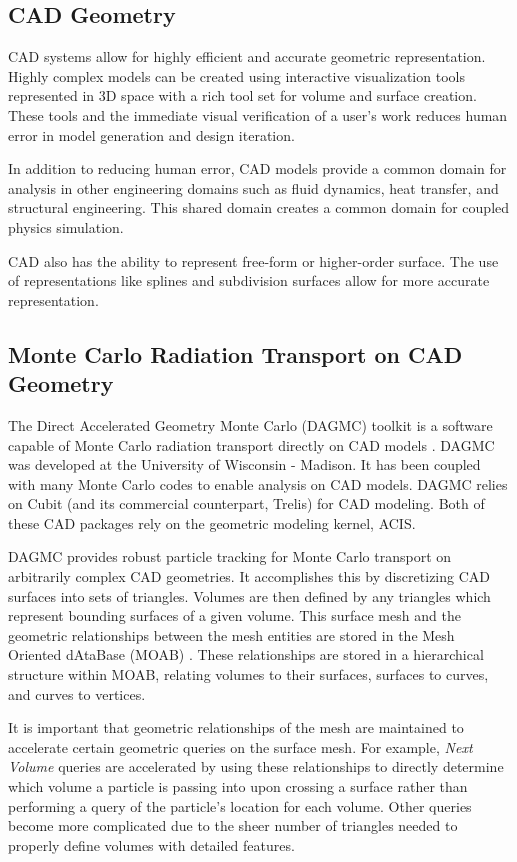\subsection{CAD Geometry}

CAD systems allow for highly efficient and accurate geometric
representation. Highly complex models can be created using interactive
visualization tools represented in 3D space with a rich tool set for volume and
surface creation. These tools and the immediate visual verification of a user's
work reduces human error in model generation and design iteration.

In addition to reducing human error, CAD models provide a common domain for
analysis in other engineering domains such as fluid dynamics, heat transfer,
and structural engineering. This shared domain creates a common domain for
coupled physics simulation.

CAD also has the ability to represent free-form or higher-order surface. The use
of representations like splines and subdivision surfaces allow for more accurate
representation.

\subsection{Monte Carlo Radiation Transport on CAD Geometry}

The Direct Accelerated Geometry Monte Carlo (DAGMC) toolkit is a software
capable of Monte Carlo radiation transport directly on CAD models
\cite{Tautges_2009}. DAGMC was developed at the University of Wisconsin -
Madison. It has been coupled with many Monte Carlo codes to enable analysis on
CAD models. DAGMC relies on Cubit (and its commercial counterpart, Trelis) for CAD
modeling. Both of these CAD packages rely on the geometric modeling kernel,
ACIS.

DAGMC provides robust particle tracking for Monte Carlo transport on
arbitrarily complex CAD geometries. It accomplishes this by discretizing CAD
surfaces into sets of triangles. Volumes are then defined by any triangles which
represent bounding surfaces of a given volume. This surface mesh and the
geometric relationships between the mesh entities are stored in the Mesh
Oriented dAtaBase (MOAB) \cite{Tautges_2004}. These relationships are stored in
a hierarchical structure within MOAB, relating volumes to their surfaces,
surfaces to curves, and curves to vertices. 

It is important that geometric relationships of the mesh are maintained to
accelerate certain geometric queries on the surface mesh. For example,
\textit{Next Volume} queries are accelerated by using these relationships to
directly determine which volume a particle is passing into upon crossing a
surface rather than performing a query of the particle's location for each
volume. Other queries become more complicated due to the sheer number of
triangles needed to properly define volumes with detailed features. 

